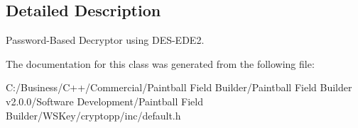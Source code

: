 \subsection{Detailed Description}
Password-\/Based Decryptor using DES-\/EDE2. 

The documentation for this class was generated from the following file:\begin{DoxyCompactItemize}
\item 
C:/Business/C++/Commercial/Paintball Field Builder/Paintball Field Builder v2.0.0/Software Development/Paintball Field Builder/WSKey/cryptopp/inc/default.h\end{DoxyCompactItemize}
